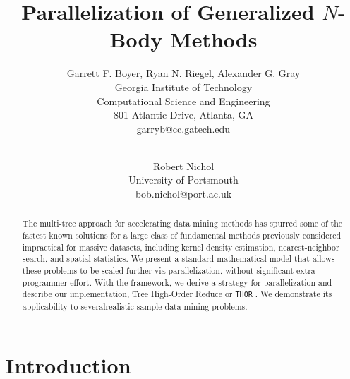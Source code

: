 \documentclass[twoside,leqno,twocolumn]{article}
\newcommand{\THOR}{{{\tt THOR}} }
\begin{document}
\title{Parallelization of Generalized $N$-Body Methods}

\author{Garrett F. Boyer, Ryan N. Riegel, Alexander G. Gray
\\ Georgia Institute of Technology
\\ Computational Science and Engineering
\\ 801 Atlantic Drive, Atlanta, GA
\\ garryb@cc.gatech.edu
\\
\and
\\ Robert Nichol
\\ University of Portsmouth
\\ bob.nichol@port.ac.uk
}

\maketitle
\thispagestyle{empty}

\begin{abstract}
The multi-tree approach for accelerating data mining methods has spurred some of the fastest known solutions for a large class of fundamental methods previously considered impractical for massive datasets, including kernel density estimation, nearest-neighbor search, and spatial statistics.
We present a standard mathematical model that allows these problems to be scaled further via parallelization, without significant extra programmer effort.
With the framework, we derive a strategy for parallelization and describe our implementation, Tree High-Order Reduce or \THOR.
We demonstrate its applicability to severalrealistic sample data mining problems.
\end{abstract}

\section{Introduction}
\end{document}
